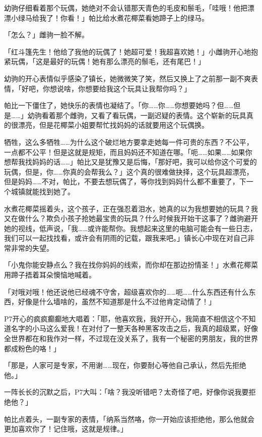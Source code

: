 幼驹仔细看着那个玩偶，她绝对不会认错那天青色的毛皮和鬃毛，「哇哦！他把漂漂小绿马给我了！你看！」帕比给水煮花椰菜看她蹄子上的绿马。

「怎么？」雌驹一脸不解。

「红斗篷先生！他给了我他的玩偶了！她超可爱！我超喜欢她！」小雌驹开心地抱紧玩偶，「这是最好的玩偶！她有那么漂亮的鬃毛，还有尾巴！」

幼驹的开心表情似乎感染了镇长，她微微笑了笑，然后又换上了之前那一副不爽表情，「好吧，你想说啥，你想要给我这个玩具让我帮你吗？」

帕比一下僵住了，她快乐的表情也凝结了。「你……你……你想要她吗？但……但是……」幼驹看着那个雌驹，又看了看玩偶，一副迟疑的表情。这个崭新的玩具真的很漂亮，但是花椰菜小姐要帮忙找妈妈的话就要用这个玩偶换。

牺牲，这么多牺牲……为什么这个破烂地方要拿走她每一件可贵的东西？不公平，一点都不公平！但是这就是规矩，而且妈妈还不知道在哪。「呃……如果……如果你想帮我找妈妈的话……」帕比又是犹豫又是后悔，「那好吧，我可以给你这个可爱的玩偶，但是，你……你真的会帮我么？」这个真的很难做抉择，这个玩具超漂亮，但是妈妈……不对，帕比，不要去想玩偶了，等你找到妈妈什么都不重要了，下一个城镇就能找到她了。

水煮花椰菜摇着头，这个孩子，正在强忍着泪水，她真的以为我想要她的玩具？我又在做什么？欺负小孩子抢她最宝贵的玩具？什么时候我开始干这事了？雌驹避开她的视线，低声说，「我……或许能帮你。我想起来这里的电脑可能会有一些日志，我们可以一起找找看，或许会有阴雨的记载，跟我来吧。」镇长心中现在对自己非常非常的失望。

\horizonline


「小鬼你能安静点么？我在找你妈妈的线索，而你却在那边扮情圣！」水煮花椰菜用蹄子捂着耳朵懊恼地喊着。

「对哦对哦！他还说他已经魂不守舍，超级喜欢你的……呃……什么东西还有什么东西，好像是什么墙啥的，虽然不知道那是什么不过他肯定动情了！」

P7开心的疯疯癫癫地大唱着：「耶，他喜欢我，我好开心，我简直不相信这个不知道名字的小马这么爱我！在对付了一整天各种黑客攻击之后，我真的超级累，好像全世界都在和我作对一样，不过现在没关系了，我有一个秘密的男朋友，我的世界都成粉色的咯！」

「那是，人家可是专家，不用谢……现在，你要耐心等他自己承认，然后先拒绝他。」

一阵长长的沉默之后，P7大叫：「啥？我没听错吧？太奇怪了吧，好像你说我要拒绝他？」

帕比点着头，一副专家的表情，「纳系当然咯，你一开始应该拒绝他，那么他就会更加喜欢你了！记住哦，这就是规律。」

